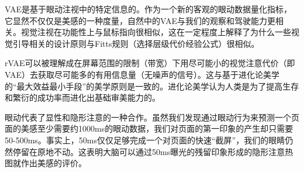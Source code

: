VAE是基于眼动注视中的特定信息的。作为一个新的客观的眼动数据量化指标，它显然不仅仅是美感的一种度量，自然中的VAE与我们的观察和驾驶能力更相关。视觉注视在功能性上与鼠标指向很相似，这在一定程度上解释了为什么一些视觉引导相关的设计原则与Fitts规则（选择层级代价经验公式）很相似。

rVAE可以被理解成在屏幕范围的限制（带宽）下用尽可能小的视觉注意代价（即VAE）去获取尽可能多的有用信息量（无噪声的信号）。这与基于进化论美学的“最大效益最小手段”的美学原则是一致的。进化论美学认为人类是为了提高生存和繁衍的成功率而进化出基础审美能力的。

眼动代表了显性和隐形注意的一种合作。虽然我们发现通过眼动行为来预测一个页面的美感至少需要约1000ms的眼动数据，我们对页面的第一印象的产生却只需要50-500ms。事实上，50ms仅仅足够完成一个对页面的快速“截屏”，我们的眼睛仍然停留在原地不动。这表明大脑可以通过50ms曝光的残留印象形成的隐形注意热图就作出美感的评价。
